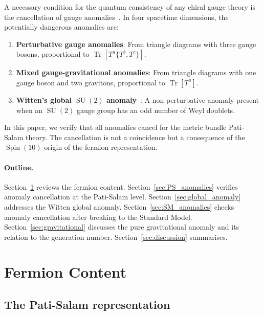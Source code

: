\documentclass[12pt,a4paper]{article}
\theoremstyle{definition}
\newcommand{\Tr}{\operatorname{Tr}}
\newcommand{\SU}{\operatorname{SU}}
\newcommand{\Spin}{\operatorname{Spin}}
\begin{document}
A necessary condition for the quantum consistency of any chiral gauge theory is the cancellation of gauge anomalies~\cite{ABJ1969,GrossJackiw1972}.
In four spacetime dimensions, the potentially dangerous anomalies are:
\begin{enumerate}[nosep]
\item \textbf{Perturbative gauge anomalies}: From triangle diagrams with three gauge bosons, proportional to $\Tr[T^a \{T^b, T^c\}]$.
\item \textbf{Mixed gauge-gravitational anomalies}: From triangle diagrams with one gauge boson and two gravitons, proportional to $\Tr[T^a]$.
\item \textbf{Witten's global $\SU(2)$ anomaly}~\cite{Witten1982}: A non-perturbative anomaly present when an $\SU(2)$ gauge group has an odd number of Weyl doublets.
\end{enumerate}

In this paper, we verify that all anomalies cancel for the metric bundle Pati-Salam theory.
The cancellation is not a coincidence but a consequence of the $\Spin(10)$ origin of the fermion representation.

\paragraph{Outline.}
Section~\ref{sec:fermion_content} reviews the fermion content.
Section~\ref{sec:PS_anomalies} verifies anomaly cancellation at the Pati-Salam level.
Section~\ref{sec:global_anomaly} addresses the Witten global anomaly.
Section~\ref{sec:SM_anomalies} checks anomaly cancellation after breaking to the Standard Model.
Section~\ref{sec:gravitational} discusses the pure gravitational anomaly and its relation to the generation number.
Section~\ref{sec:discussion} summarises.


\section{Fermion Content}
\label{sec:fermion_content}

\subsection{The Pati-Salam representation}
\end{document}
